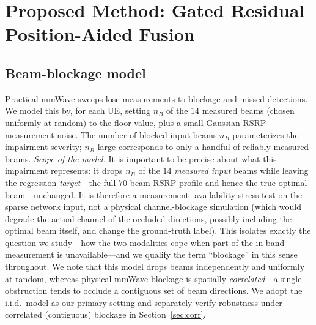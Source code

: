 \documentclass[conference]{IEEEtran}
\begin{document}
\section{Proposed Method: Gated Residual Position-Aided Fusion}\label{sec:method}

\subsection{Beam-blockage model}
Practical mmWave sweeps lose measurements to blockage and missed detections. We
model this by, for each UE, setting $n_B$ of the $14$ measured beams (chosen
uniformly at random) to the floor value, plus a small Gaussian RSRP measurement
noise. The number of blocked input beams $n_B$ parameterizes the impairment
severity; $n_B$ large corresponds to only a handful of reliably measured beams.
\emph{Scope of the model.} It is important to be precise about what this
impairment represents: it drops $n_B$ of the $14$ \emph{measured input} beams
while leaving the regression \emph{target}---the full $70$-beam RSRP profile and
hence the true optimal beam---unchanged. It is therefore a measurement-%
availability stress test on the sparse network input, not a physical
channel-blockage simulation (which would degrade the actual channel of the
occluded directions, possibly including the optimal beam itself, and change the
ground-truth label). This isolates exactly the question we study---how the two
modalities cope when part of the in-band measurement is unavailable---and we
qualify the term ``blockage'' in this sense throughout. We note that this model
drops beams independently and uniformly at random,
whereas physical mmWave blockage is spatially \emph{correlated}---a single
obstruction tends to occlude a contiguous set of beam directions. We adopt the
i.i.d.\ model as our primary setting and separately verify robustness under
correlated (contiguous) blockage in Section~\ref{sec:corr}.
\end{document}
